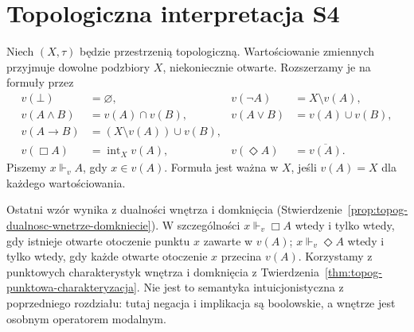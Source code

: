 \section{Topologiczna interpretacja S4}

\begin{definicja}
\label{def:ncl-modal-topological-model}
Niech $(X,\tau)$ będzie przestrzenią topologiczną.
Wartościowanie zmiennych przyjmuje dowolne
podzbiory $X$, niekoniecznie otwarte.
Rozszerzamy je na formuły przez
\[
\begin{aligned}
 v(\bot)&=\varnothing,&
 v(\neg A)&=X\setminus v(A),\\
 v(A\wedge B)&=v(A)\cap v(B),&
 v(A\vee B)&=v(A)\cup v(B),\\
 v(A\to B)&=(X\setminus v(A))\cup v(B),\\
 v(\Box A)&=\operatorname{int}_X v(A),&
 v(\Diamond A)&=\overline{v(A)}.
\end{aligned}
\]
Piszemy $x\Vdash_v A$, gdy $x\in v(A)$.
Formuła jest ważna w $X$, jeśli $v(A)=X$
dla każdego wartościowania.
\end{definicja}
Ostatni wzór wynika z dualności wnętrza
i domknięcia
(Stwierdzenie~\ref{prop:topog-dualnosc-wnetrze-domkniecie}). W szczególności
$x\Vdash_v\Box A$ wtedy i tylko wtedy, gdy
istnieje otwarte otoczenie punktu $x$
zawarte w $v(A)$; $x\Vdash_v\Diamond A$
wtedy i tylko wtedy, gdy każde otwarte
otoczenie $x$ przecina $v(A)$.
Korzystamy z punktowych charakterystyk
wnętrza i domknięcia z
Twierdzenia~\ref{thm:topog-punktowa-charakteryzacja}.
Nie jest to semantyka intuicjonistyczna
z poprzedniego rozdziału: tutaj negacja
i implikacja są boolowskie, a wnętrze
jest osobnym operatorem modalnym.

